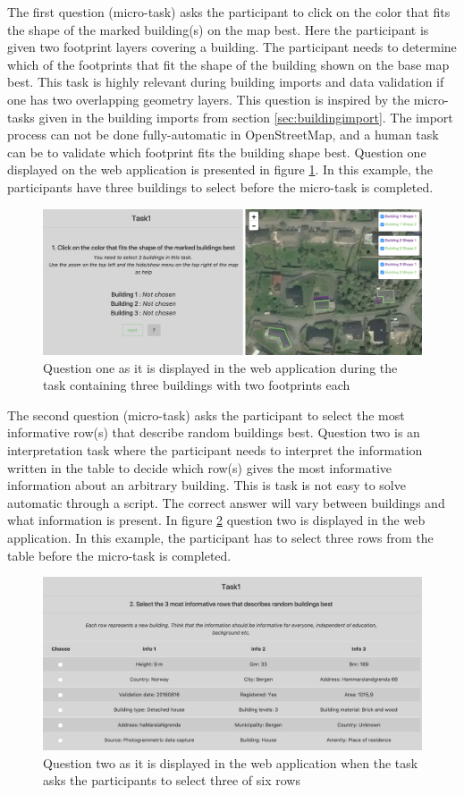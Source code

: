 The first question (micro-task) asks the participant to click on the color that fits the shape of the marked building(s) on the map best. Here the participant is given two footprint layers covering a building. The participant needs to determine which of the footprints that fit the shape of the building shown on the base map best. This task is highly relevant during building imports and data validation if one has two overlapping geometry layers. This question is inspired by the micro-tasks given in the building imports from section \ref{sec:buildingimport}. The import process can not be done fully-automatic in OpenStreetMap, and a human task can be to validate which footprint fits the building shape best. Question one displayed on the web application is presented in figure \ref{fig:q12}. In this example, the participants have three buildings to select before the micro-task is completed. 

\begin{figure}[H]
	\centering
	\includegraphics[width=0.8\linewidth]{fig/q1_2}
	\caption{Question one as it is displayed in the web application during the task containing three buildings with two footprints each}
	\label{fig:q12}
\end{figure}

The second question (micro-task) asks the participant to select the most informative row(s) that describe random buildings best. Question two is an interpretation task where the participant needs to interpret the information written in the table to decide which row(s) gives the most informative information about an arbitrary building. This is task is not easy to solve automatic through a script. The correct answer will vary between buildings and what information is present. In figure \ref{fig:q22} question two is displayed in the web application. In this example, the participant has to select three rows from the table before the micro-task is completed. 

\begin{figure}[H]
	\centering
	\includegraphics[width=0.8\linewidth]{fig/q2_2}
	\caption{Question two as it is displayed in the web application when the task asks the participants to select three of six rows}
	\label{fig:q22}
\end{figure}

